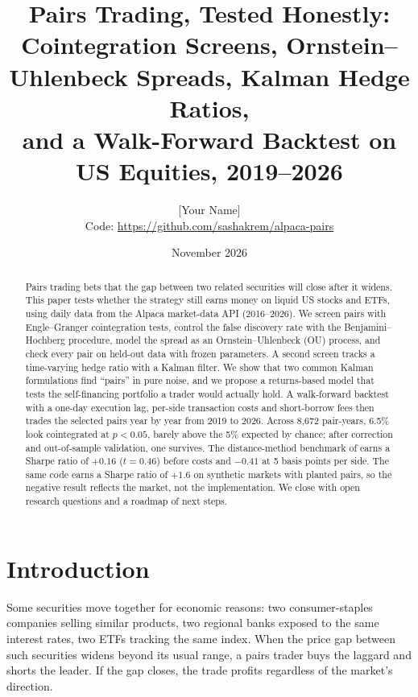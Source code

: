 \documentclass[11pt]{article}
\title{Pairs Trading, Tested Honestly:\\[2pt]
\large Cointegration Screens, Ornstein--Uhlenbeck Spreads, Kalman Hedge Ratios,\\
and a Walk-Forward Backtest on US Equities, 2019--2026}
\author{[Your Name]\\[2pt]
\small Code: \url{https://github.com/sashakrem/alpaca-pairs}}
\date{November 2026}
\begin{document}
\maketitle

\begin{abstract}
\noindent
Pairs trading bets that the gap between two related securities will close after it widens.
This paper tests whether the strategy still earns money on liquid US stocks and ETFs, using
daily data from the Alpaca market-data API (2016--2026). We screen pairs with Engle--Granger
cointegration tests, control the false discovery rate with the Benjamini--Hochberg procedure,
model the spread as an Ornstein--Uhlenbeck (OU) process, and check every pair on held-out
data with frozen parameters. A second screen tracks a time-varying hedge ratio with a Kalman
filter. We show that two common Kalman formulations find ``pairs'' in pure noise, and we
propose a returns-based model that tests the self-financing portfolio a trader would
actually hold. A walk-forward backtest with a one-day execution lag, per-side transaction
costs and short-borrow fees then trades the selected pairs year by year from 2019 to 2026.
Across 8{,}672 pair-years, 6.5\% look cointegrated at $p<0.05$, barely above the 5\% expected
by chance; after correction and out-of-sample validation, one survives. The distance-method
benchmark of \citet{gatev2006} earns a Sharpe ratio of $+0.16$ ($t=0.46$) before costs and
$-0.41$ at 5 basis points per side. The same code earns a Sharpe ratio of $+1.6$ on synthetic
markets with planted pairs, so the negative result reflects the market, not the
implementation. We close with open research questions and a roadmap of next steps.
\end{abstract}

\section{Introduction}

Some securities move together for economic reasons: two consumer-staples companies selling
similar products, two regional banks exposed to the same interest rates, two ETFs tracking
the same index. When the price gap between such securities widens beyond its usual range, a
pairs trader buys the laggard and shorts the leader. If the gap closes, the trade profits
regardless of the market's direction.
\end{document}
